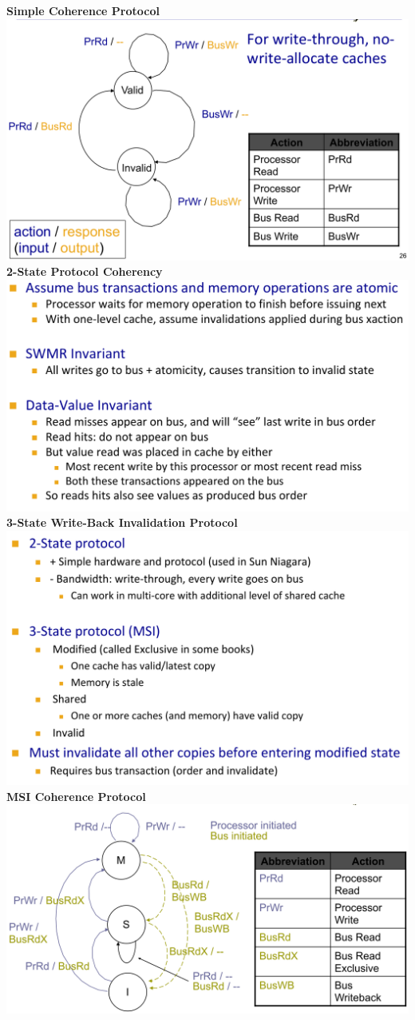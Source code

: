 \textbf{Simple Coherence Protocol}\\
\includegraphics[width=\linewidth]{png/protofsm.png}
\textbf{2-State Protocol Coherency}\\
\includegraphics[width=\linewidth]{png/2proto.png}
\textbf{3-State Write-Back Invalidation Protocol}\\
\includegraphics[width=\linewidth]{png/3proto.png}
\textbf{MSI Coherence Protocol}\\
\includegraphics[width=\linewidth]{png/msi.png}
